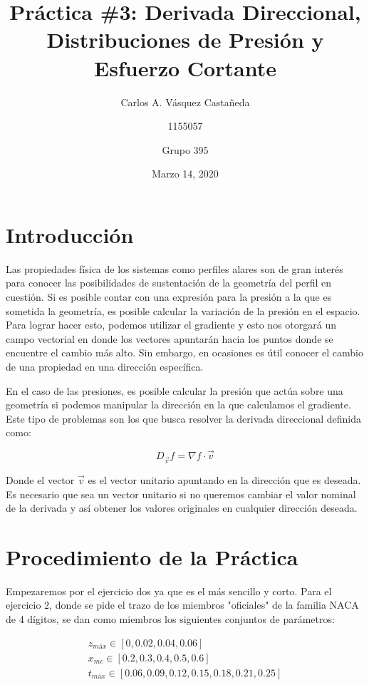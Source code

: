 \documentclass[12pt, letterpaper]{article}
\title{Práctica \#3: Derivada Direccional, Distribuciones de Presión y Esfuerzo Cortante}
\author{Carlos A. Vásquez Castañeda \and 1155057 \and Grupo 395}
\date{Marzo 14, 2020}
\begin{document}
\maketitle

\section*{Introducción}
Las propiedades física de los sistemas como perfiles alares son de gran interés para conocer las posibilidades de sustentación de la geometría del perfil en cuestión. Si es posible contar con una expresión para la presión a la que es sometida la geometría, es posible calcular la variación de la presión en el espacio. Para lograr hacer esto, podemos utilizar el gradiente y esto nos otorgará un campo vectorial en donde los vectores apuntarán hacia los puntos donde se encuentre el cambio más alto. Sin embargo, en ocasiones es útil conocer el cambio de una propiedad en una dirección específica.

En el caso de las presiones, es posible calcular la presión que actúa sobre una geometría si podemos manipular la dirección en la que calculamos el gradiente. Este tipo de problemas son los que busca resolver la derivada direccional definida como:

\begin{equation}
	D_{\vec{v}}f = \nabla f \cdot \vec{v}
\end{equation}

Donde el vector $\vec{v}$ es el vector unitario apuntando en la dirección que es deseada. Es necesario que sea un vector unitario si no queremos cambiar el valor nominal de la derivada y así obtener los valores originales en cualquier dirección deseada.
\newpage

\section*{Procedimiento de la Práctica}
Empezaremos por el ejercicio dos ya que es el más sencillo y corto.
Para el ejercicio 2, donde se pide el trazo de los miembros "oficiales" de la familia NACA de 4 dígitos, se dan como miembros los siguientes conjuntos de parámetros:

\begin{equation}
	\begin{split}
		z_{máx} \in [0, 0.02, 0.04, 0.06] \\
		x_{mc} \in [0.2, 0.3, 0.4, 0.5, 0.6] \\
		t_{máx} \in [0.06, 0.09, 0.12, 0.15, 0.18, 0.21, 0.25] \\
	\end{split}
\end{equation}
\end{document}
